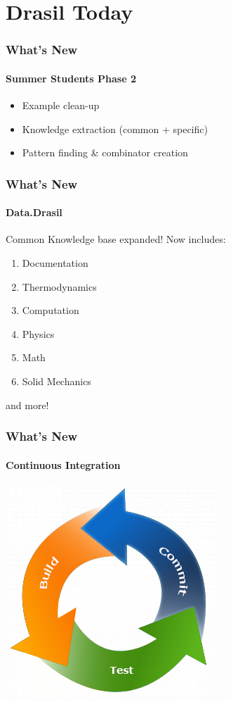 \documentclass{beamer}
\begin{document}

\section[Drasil]{Drasil Today}


\begin{frame}

\frametitle{What's New}
\framesubtitle{Summer Students Phase 2}

\begin{itemize}
	\item Example clean-up
	\item Knowledge extraction (common + specific)
	\item Pattern finding \& combinator creation
\end{itemize}

\end{frame}


\begin{frame}

\frametitle{What's New}

\framesubtitle{Data.Drasil}

Common Knowledge base expanded! Now includes:
\begin{enumerate}
\item Documentation
\item Thermodynamics 
\item Computation
\item Physics
\item Math
\item Solid Mechanics
\end{enumerate}
and more!

\end{frame}


\begin{frame}

\frametitle{What's New}
\framesubtitle{Continuous Integration}

\begin{center}
\includegraphics[scale=.72]{CI.jpg}
\end{center}

\end{frame}
\end{document}
